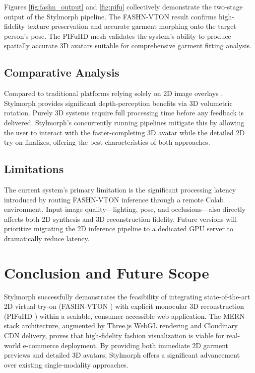 \documentclass[conference]{IEEEtran}
\begin{document}
Figures \ref{fig:fashn_output} and \ref{fig:pifu} collectively demonstrate the two-stage output of the Stylmorph pipeline. The FASHN-VTON result confirms high-fidelity texture preservation and accurate garment morphing onto the target person's pose. The PIFuHD mesh validates the system's ability to produce spatially accurate 3D avatars suitable for comprehensive garment fitting analysis.


\subsection{Comparative Analysis}
Compared to traditional platforms relying solely on 2D image overlays \cite{b24}\cite{b25}, Stylmorph provides significant depth-perception benefits via 3D volumetric rotation. Purely 3D systems \cite{b1} require full processing time before any feedback is delivered. Stylmorph's concurrently running pipelines mitigate this by allowing the user to interact with the faster-completing 3D avatar while the detailed 2D try-on finalizes, offering the best characteristics of both approaches.

\subsection{Limitations}
The current system's primary limitation is the significant processing latency introduced by routing FASHN-VTON inference through a remote Colab environment. Input image quality—lighting, pose, and occlusions—also directly affects both 2D synthesis and 3D reconstruction fidelity. Future versions will prioritize migrating the 2D inference pipeline to a dedicated GPU server to dramatically reduce latency.

\section{Conclusion and Future Scope}

Stylmorph successfully demonstrates the feasibility of integrating state-of-the-art 2D virtual try-on (FASHN-VTON \cite{b23}) with explicit monocular 3D reconstruction (PIFuHD \cite{b1}) within a scalable, consumer-accessible web application. The MERN-stack architecture, augmented by Three.js WebGL rendering and Cloudinary CDN delivery, proves that high-fidelity fashion visualization is viable for real-world e-commerce deployment. By providing both immediate 2D garment previews and detailed 3D avatars, Stylmorph offers a significant advancement over existing single-modality approaches.
\end{document}
